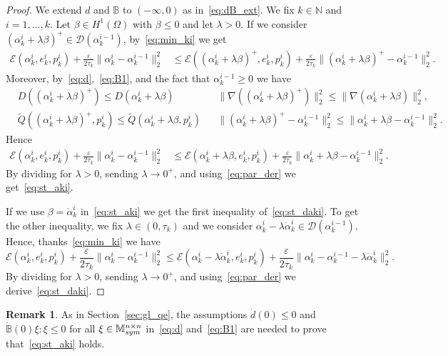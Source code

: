 \documentclass[reqno]{amsart}
\theoremstyle{definition}
\newtheorem{remark}[corollary]{Remark}
\numberwithin{equation}{section}
\def\N {\mathbb N}
\def\M {\mathbb M^{n\times n}_{\rm sym}}
\def\B {\mathbb B}
\begin{document}
\begin{proof}
We extend $d$ and $\mathbb B$ to $(-\infty,0)$ as in~\eqref{eq:dB_ext}. We fix $k\in\N$ and $i=1,\dots,k$. Let $\beta\in H^1(\Omega)$ with $\beta\le 0$  and let $\lambda>0$. If we consider
$(\alpha_k^i+\lambda\beta)^+\in \mathcal D(\alpha_k^{i-1})$,  by~\eqref{eq:min_ki} we get
\begin{align*}
\mathcal E(\alpha_k^i,e_k^i,p_k^i)+\frac{\varepsilon}{2\tau_k}\|\alpha_k^i-\alpha_k^{i-1}\|_2^2&\le \mathcal E((\alpha_k^i+\lambda\beta)^+,e_k^i,p_k^i)+\frac{\varepsilon}{2\tau_k}\|(\alpha_k^i+\lambda\beta)^+-\alpha_k^{i-1}\|_2^2.
\end{align*}
Moreover, by~\eqref{eq:d},~\eqref{eq:B1}, and the fact that
$\alpha_k^{i-1}\ge 0$ we have
\begin{align*}
&D((\alpha_k^i+\lambda\beta)^+)\le D(\alpha_k^i+\lambda\beta)& &\|\nabla((\alpha_k^i+\lambda\beta)^+)\|^2_2\le \|\nabla(\alpha_k^i+\lambda\beta)\|_2^2,\\
&\tilde Q((\alpha_k^i+\lambda \beta)^+,p_k^i)\le \tilde Q(\alpha_k^i+\lambda \beta,p_k^i)  & &\|(\alpha_k^i+\lambda\beta)^+-\alpha_k^{i-1}\|_2^2\le \|\alpha_k^i+\lambda\beta-\alpha_k^{i-1}\|_2^2.
\end{align*}
Hence
\begin{align*}
\mathcal E(\alpha_k^i,e_k^i,p_k^i)+\frac{\varepsilon}{2\tau_k}\|\alpha_k^i-\alpha_k^{i-1}\|_2^2&\le \mathcal E(\alpha_k^i+\lambda\beta,e_k^i,p_k^i)+\frac{\varepsilon}{2\tau_k}\|\alpha_k^i+\lambda\beta-\alpha_k^{i-1}\|_2^2.
\end{align*}
By dividing for $\lambda>0$, sending $\lambda\to 0^+$, and using~\eqref{eq:par_der} we get~\eqref{eq:st_aki}.

If we use $\beta=\dot\alpha_k^i$ in~\eqref{eq:st_aki} we get the first inequality of~\eqref{eq:st_daki}. To get the other inequality, we fix $\lambda\in (0,\tau_k)$ and we consider $\alpha_k^i-\lambda\dot\alpha_k^i\in\mathcal D(\alpha_k^{i-1})$. Hence, thanks~\eqref{eq:min_ki} we have
\begin{equation*}\mathcal E(\alpha_k^i,e_k^i,p_k^i)+\frac{\varepsilon}{2\tau_k}\|\alpha_k^i-\alpha_k^{i-1}\|_2^2\le \mathcal E(\alpha_k^i-\lambda\dot\alpha_k^i,e_k^i,p_k^i)+\frac{\varepsilon}{2\tau_k}\|\alpha_k^i-\alpha_k^{i-1}-\lambda\dot\alpha_k^i\|_2^2.\end{equation*}
By dividing for $\lambda>0$, sending $\lambda\to 0^+$, and using~\eqref{eq:par_der} we derive~\eqref{eq:st_daki}.
\end{proof}

\begin{remark}
As in Section~\ref{sec:gl_qe}, the assumptions $\dot d(0)\le 0$ and $\dot{\B}(0)\xi:\xi\le 0$ for all $\xi\in\M$ in~\eqref{eq:d} and~\eqref{eq:B1} are needed to prove that~\eqref{eq:st_aki} holds.
\end{remark}
\end{document}
